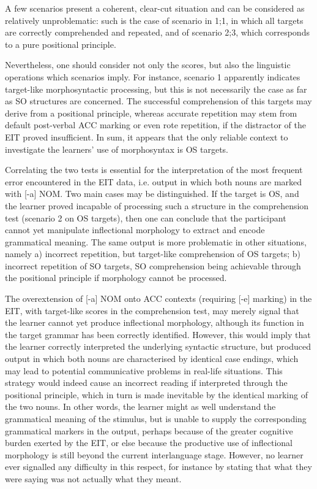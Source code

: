 A few scenarios present a coherent, clear-cut situation and can be considered as relatively unproblematic: such is the case of scenario in 1;1, in which all targets are correctly comprehended and repeated, and of scenario 2;3, which corresponds to a pure positional principle. 

Nevertheless, one should consider not only the scores, but also the linguistic operations which scenarios imply. For instance, scenario 1 apparently indicates target-like morphosyntactic processing, but this is not necessarily the case as far as SO structures are concerned. The successful comprehension of this targets may derive from a positional principle, whereas accurate repetition may stem from default post-verbal ACC marking or even rote repetition, if the distractor of the EIT proved insufficient. In sum, it appears that the only reliable context to investigate the learners’ use of morphosyntax is OS targets.

Correlating the two tests is essential for the interpretation of the most frequent error encountered in the EIT data, i.e. output in which both nouns are marked with [-a] NOM. Two main cases may be distinguished. If the target is OS, and the learner proved incapable of processing such a structure in the comprehension test (scenario 2 on OS targets), then one can conclude that the participant cannot yet manipulate inflectional morphology to extract and encode grammatical meaning. The same output is more problematic in other situations, namely a) incorrect repetition, but target-like comprehension of OS targets; b) incorrect repetition of SO targets, SO comprehension being achievable through the positional principle if morphology cannot be processed.

The overextension of [-a] NOM onto ACC contexts (requiring [-e] marking) in the EIT, with target-like scores in the comprehension test, may merely signal that the learner cannot yet produce inflectional morphology, although its function in the target grammar has been correctly identified. However, this would imply that the learner correctly interpreted the underlying syntactic structure, but produced output in which both nouns are characterised by identical case endings, which may lead to potential communicative problems in real-life situations. This strategy would indeed cause an incorrect reading if interpreted through the positional principle, which in turn is made inevitable by the identical marking of the two nouns. In other words, the learner might as well understand the grammatical meaning of the stimulus, but is unable to supply the corresponding grammatical markers in the output, perhaps because of the greater cognitive burden exerted by the EIT, or else because the productive use of inflectional morphology is still beyond the current interlanguage stage. However, no learner ever signalled any difficulty in this respect, for instance by stating that what they were saying was not actually what they meant.

